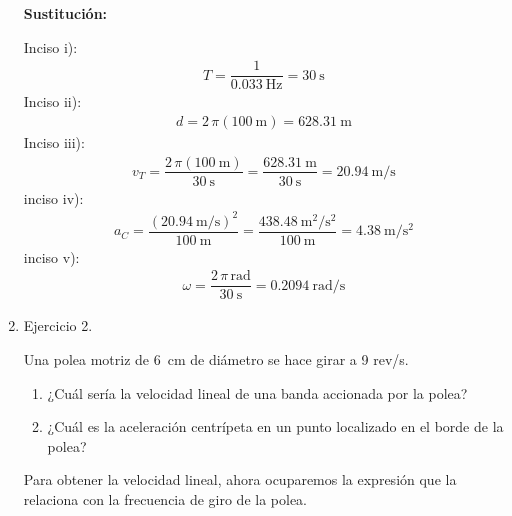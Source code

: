 \documentclass[12pt]{article}
\begin{document}
\begin{enumerate}
\textbf{Sustitución:}

Inciso i):
\begin{align*}
T = \dfrac{1}{\SI{0.033}{\hertz}} = \SI{30}{\second}
\end{align*}
Inciso ii):
\begin{align*}
d = 2 \, \pi \left( \SI{100}{\meter} \right) = \SI{628.31}{\meter}
\end{align*}
Inciso iii):
\begin{align*}
v_{T} = \dfrac{2 \, \pi (\SI{100}{\meter})}{\SI{30}{\second}} = \dfrac{\SI{628.31}{\meter}}{\SI{30}{\second}} = \SI[per-mode=fraction]{20.94}{\meter\per\second}
\end{align*}
inciso iv):
\begin{align*}
a_{C} = \dfrac{\displaystyle \left( \SI[per-mode=fraction]{20.94}{\meter\per\second} \right)^{2}}{\SI{100}{\meter}} = \dfrac{\displaystyle \SI[per-mode=fraction]{438.48}{\square\meter\per\square\second}}{\SI{100}{\meter}} = \SI[per-mode=fraction]{4.38}{\meter\per\square\second}
\end{align*}
inciso v):
\begin{align*}
\omega = \dfrac{2 \, \pi \, \unit{\radian}}{\SI{30}{\second}} = \SI[per-mode=fraction]{0.2094}{\radian\per\second}
\end{align*}


\item Ejercicio 2.

Una polea motriz de \SI{6}{\centi\meter} de diámetro se hace girar a 9 rev/s.
\begin{enumerate}[label=\alph*)]
\item ¿Cuál sería la velocidad lineal de una banda accionada por la polea?
\item ¿Cuál es la aceleración centrípeta en un punto localizado en el borde de la polea?
\end{enumerate}

Para obtener la velocidad lineal, ahora ocuparemos la expresión que la relaciona con la frecuencia de giro de la polea.


\end{enumerate}
\end{document}
